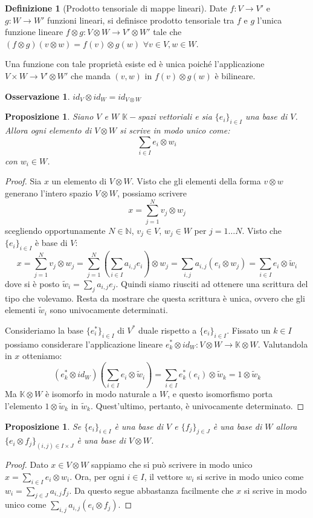 \documentclass[11pt]{article}
\theoremstyle{plain}
\newtheorem{prop}[thm]{Proposizione}
\theoremstyle{definition}
\newtheorem{defn}{Definizione}[section]
\newtheorem*{rem}{Osservazione}
\theoremstyle{remark}
\newcommand{\K}{\mathbb{K}}
\newcommand{\N}{\mathbb{N}}
\begin{document}
\begin{defn}[Prodotto tensoriale di mappe lineari]
Date $f:V \to V'$ e $g:W \to W'$ funzioni lineari, si definisce prodotto tensoriale tra $f$ e $g$ l'unica funzione lineare $f \otimes g : V \otimes W \to V' \otimes W'$ tale che $(f \otimes g)(v \otimes w)=f(v) \otimes g(w)$ $\forall v\in V, w\in W$.

Una funzione con tale proprietà esiste ed è unica poiché l'applicazione $V\times W \to V'\otimes W'$ che manda $(v,w)$ in $f(v)\otimes g(w)$ è bilineare.
\end{defn}

\begin{rem}
$id_V \otimes id_W = id_{V\otimes W}$
\end{rem}


\begin{prop}
Siano $V$ e $W$ $\K-$spazi vettoriali e sia $\{e_i\}_{i\in I}$ una base di $V$. Allora ogni elemento di $V\otimes W$ si scrive in modo unico come:
\[ \sum_{i\in I} e_i \otimes w_i\]
con $w_i\in W$.
\end{prop}
\begin{proof}
Sia $x$ un elemento di $V\otimes W$.
Visto che gli elementi della forma $v\otimes w$ generano l'intero spazio $V\otimes W$, possiamo scrivere
\[ x = \sum_{j=1}^N v_j\otimes w_j \]
scegliendo opportunamente $N\in \N$, $v_j\in V$, $w_j\in W$ per $j=1\dots N$. Visto che $\{e_i\}_{i\in I}$ è base di $V$:
\[ x = \sum_{j=1}^N v_j\otimes w_j  = \sum_{j=1}^N \left(\sum_{i\in I} a_{i,j}e_i\right)\otimes w_j = \sum_{i,j} a_{i,j}(e_i\otimes w_j) = \sum_{i\in I} e_i\otimes\tilde w_i\]
dove si è posto $\tilde w_i = \sum_j a_{i,j}e_j$.
Quindi siamo riusciti ad ottenere una scrittura del tipo che volevamo. Resta da mostrare che questa scrittura è unica,
ovvero che gli elementi $\tilde w_i$ sono univocamente determinati.

Consideriamo la base $\{e_i^*\}_{i\in I}$ di $V^*$ duale rispetto a $\{e_i\}_{i\in I}$. Fissato un $k\in I$ possiamo considerare l'applicazione
lineare $e_k^*\otimes id_W: V\otimes W \to \K\otimes W$. Valutandola in $x$ otteniamo:
\[ (e_k^*\otimes id_W) \left(\sum_{i\in I} e_i\otimes\tilde w_i \right) = \sum_{i\in I} e_k^*(e_i)\otimes\tilde w_k = 1\otimes \tilde w_k\]
Ma $\K\otimes W$ è isomorfo in modo naturale a $W$, e questo isomorfismo porta l'elemento $1\otimes \tilde w_k$ in $\tilde w_k$.
Quest'ultimo, pertanto, è univocamente determinato.
\end{proof}

\begin{prop}
Se $\{e_i\}_{i\in I}$ è una base di $V$ e $\{f_j\}_{j\in J}$ è una base di $W$ allora $\{e_i \otimes f_j\}_{(i,j)\in I\times J}$ è una base di $V \otimes W$.
\end{prop}
\begin{proof}
Dato $x\in V\otimes W$ sappiamo che si può scrivere in modo unico $x = \sum_{i\in I} e_i\otimes w_i$.
Ora, per ogni $i\in I$, il vettore $w_i$ si scrive in modo unico come $w_i = \sum_{j\in J} a_{i,j}f_j$.
Da questo segue abbastanza facilmente che $x$ si scrive in modo unico come $\sum_{i,j} a_{i,j}(e_i\otimes f_j)$.
\end{proof}
\end{document}
